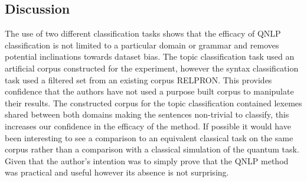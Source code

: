 \documentclass[a4paper,twocolumn,11pt]{quantumarticle}
\begin{document}
    \subsection{Discussion}\label{subsec:discussion}
    The use of two different classification tasks shows that the efficacy of QNLP classification is not limited to a
    particular domain or grammar and removes potential inclinations towards dataset bias.
    The topic classification task used an artificial corpus constructed for the experiment,
    however the syntax classification task used a filtered set from an existing corpus RELPRON\cite{qnlp_in_prac}.
    This provides confidence that the authors have not used a purpose built corpus to manipulate their results.
    The constructed corpus for the topic classification contained lexemes shared between both domains making the
    sentences non-trivial to classify, this increases our confidence in the efficacy of the method.
    \newline
    If possible it would have been interesting to see a comparison to an equivalent classical task on the same corpus
    rather than a comparison with a classical simulation of the quantum task.
    Given that the author's intention was to simply prove that the QNLP method was practical and useful however its
    absence is not surprising.
\end{document}
